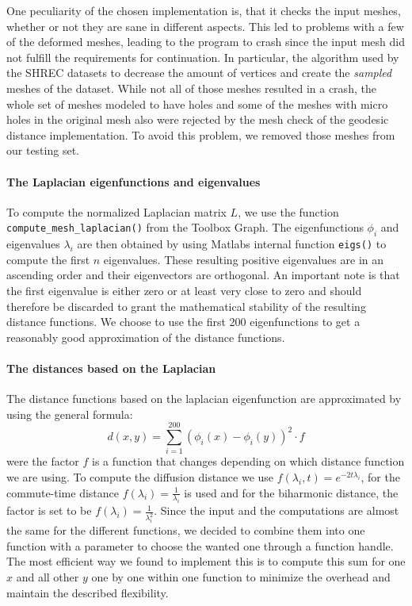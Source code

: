 One peculiarity of the chosen implementation is, that it checks the input meshes, whether or not they are sane in different aspects.
This led to problems with a few of the deformed meshes, leading to the program to crash since the input mesh did not fulfill the requirements for continuation.
In particular, the algorithm used by the SHREC datasets to decrease the amount of vertices and create the \textit{sampled} meshes of the dataset.
While not all of those meshes resulted in a crash, the whole set of meshes modeled to have holes and some of the meshes with micro holes in the original mesh also were rejected by the mesh check of the geodesic distance implementation.
To avoid this problem, we removed those meshes from our testing set.

\paragraph{The Laplacian eigenfunctions and eigenvalues}
To compute the normalized Laplacian matrix $L$, we use the function \texttt{compute\_mesh\_laplacian()} from the Toolbox Graph.
The eigenfunctions $\phi_i$ and eigenvalues $\lambda_i$ are then obtained by using Matlabs internal function \texttt{eigs()} to compute the first $n$ eigenvalues.
These resulting positive eigenvalues are in an ascending order and their eigenvectors are orthogonal.
An important note is that the first eigenvalue is either zero or at least very close to zero and should therefore be discarded to grant the mathematical stability of the resulting distance functions.
We choose to use the first 200 eigenfunctions to get a reasonably good approximation of the distance functions.

\paragraph{The distances based on the Laplacian}
The distance functions based on the laplacian eigenfunction are approximated by using the general formula:
\begin{equation}
	d(x,y) = \sum_{i=1}^{200} (\phi_i(x) - \phi_i(y))^2 \cdot f
\end{equation}
were the factor $f$ is a function that changes depending on which distance function we are using.
To compute the diffusion distance we use $f(\lambda_i,t) = e^{-2t\lambda_i}$, for the commute-time distance $f(\lambda_i) = \frac{1}{\lambda_i}$ is used and for the biharmonic distance, the factor is set to be $f(\lambda_i) = \frac{1}{\lambda_i^2}$.
Since the input and the computations are almost the same for the different functions, we decided to combine them into one function with a parameter to choose the wanted one through a function handle.
The most efficient way we found to implement this is to compute this sum for one $x$ and all other $y$ one by one within one function to minimize the overhead and maintain the described flexibility.

